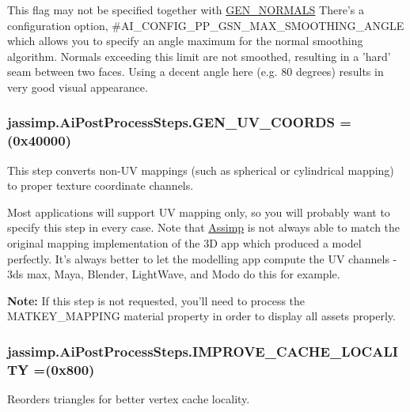 This flag may not be specified together with \hyperlink{enumjassimp_1_1_ai_post_process_steps_a72fa11465e238a3a5a156c061f3c68b3}{G\+E\+N\+\_\+\+N\+O\+R\+M\+A\+L\+S} There's a configuration option, {\ttfamily \#\+A\+I\+\_\+\+C\+O\+N\+F\+I\+G\+\_\+\+P\+P\+\_\+\+G\+S\+N\+\_\+\+M\+A\+X\+\_\+\+S\+M\+O\+O\+T\+H\+I\+N\+G\+\_\+\+A\+N\+G\+L\+E} which allows you to specify an angle maximum for the normal smoothing algorithm. Normals exceeding this limit are not smoothed, resulting in a 'hard' seam between two faces. Using a decent angle here (e.\+g. 80 degrees) results in very good visual appearance. \hypertarget{enumjassimp_1_1_ai_post_process_steps_a828a5efc49f107dce2ce4c4bcf11167c}{
\subsubsection[{G\+E\+N\+\_\+\+U\+V\+\_\+\+C\+O\+O\+R\+D\+S}]{\setlength{\rightskip}{0pt plus 5cm}jassimp.\+Ai\+Post\+Process\+Steps.\+G\+E\+N\+\_\+\+U\+V\+\_\+\+C\+O\+O\+R\+D\+S =(0x40000)}}\label{enumjassimp_1_1_ai_post_process_steps_a828a5efc49f107dce2ce4c4bcf11167c}
This step converts non-\/\+U\+V mappings (such as spherical or cylindrical mapping) to proper texture coordinate channels.

Most applications will support U\+V mapping only, so you will probably want to specify this step in every case. Note that \hyperlink{class_assimp}{Assimp} is not always able to match the original mapping implementation of the 3\+D app which produced a model perfectly. It's always better to let the modelling app compute the U\+V channels -\/ 3ds max, Maya, Blender, Light\+Wave, and Modo do this for example.

{\bfseries Note\+:} If this step is not requested, you'll need to process the {\ttfamily M\+A\+T\+K\+E\+Y\+\_\+\+M\+A\+P\+P\+I\+N\+G} material property in order to display all assets properly. \hypertarget{enumjassimp_1_1_ai_post_process_steps_aa33035e8d355e1f579e6c6db9429476c}{
\subsubsection[{I\+M\+P\+R\+O\+V\+E\+\_\+\+C\+A\+C\+H\+E\+\_\+\+L\+O\+C\+A\+L\+I\+T\+Y}]{\setlength{\rightskip}{0pt plus 5cm}jassimp.\+Ai\+Post\+Process\+Steps.\+I\+M\+P\+R\+O\+V\+E\+\_\+\+C\+A\+C\+H\+E\+\_\+\+L\+O\+C\+A\+L\+I\+T\+Y =(0x800)}}\label{enumjassimp_1_1_ai_post_process_steps_aa33035e8d355e1f579e6c6db9429476c}
Reorders triangles for better vertex cache locality.

